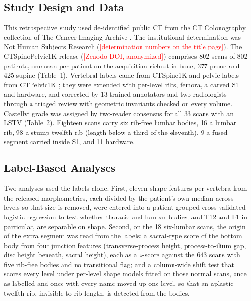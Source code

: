 \documentclass[12pt]{article}
\newcommand{\todo}[1]{\textcolor{red}{[#1]}}
\newcommand{\dataset}{CTSpinoPelvic1K}
\begin{document}
\subsection*{Study Design and Data}
This retrospective study used de-identified public CT from the CT Colonography collection of The Cancer Imaging Archive \citep{Smith2015DataCOLONOGRAPHY}. The institutional determination was Not Human Subjects Research (\todo{determination numbers on the title page}). The \dataset{} release (\todo{Zenodo DOI, anonymized}) comprises 802 scans of 802 patients, one scan per patient on the acquisition richest in bone, 377 prone and 425 supine (Table~1). Vertebral labels came from CTSpine1K \citep{Deng2021CTSpine1K:Tomography} and pelvic labels from CTPelvic1K \citep{Liu2021DeepModels}; they were extended with per-level ribs, femora, a carved S1 and hardware, and corrected by 13 trained annotators and two radiologists through a triaged review with geometric invariants checked on every volume. Castellvi grade was assigned by two-reader consensus for all 33 scans with an LSTV (Table~2). Eighteen scans carry six rib-free lumbar bodies, 16 a lumbar rib, 98 a stump twelfth rib (length below a third of the eleventh), 9 a fused segment carried inside S1, and 11 hardware.

\subsection*{Label-Based Analyses}
Two analyses used the labels alone. First, eleven shape features per vertebra from the released morphometrics, each divided by the patient's own median across levels so that size is removed, were entered into a patient-grouped cross-validated logistic regression to test whether thoracic and lumbar bodies, and T12 and L1 in particular, are separable on shape. Second, on the 18 six-lumbar scans, the origin of the extra segment was read from the labels: a sacral-type score of the bottom body from four junction features (transverse-process height, process-to-ilium gap, disc height beneath, sacral height), each as a $z$-score against the 643 scans with five rib-free bodies and no transitional flag; and a column-wide shift test that scores every level under per-level shape models fitted on those normal scans, once as labelled and once with every name moved up one level, so that an aplastic twelfth rib, invisible to rib length, is detected from the bodies.
\end{document}
